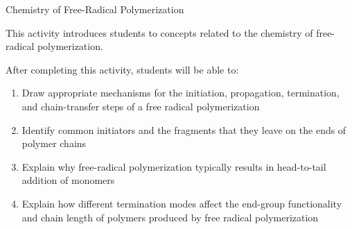 %
%
%
%

\renewcommand{\figpath}{content/polymchem/freeradical/FRPchemistry/figs}
\renewcommand{\labelbase}{FRPchemistry}

\begin{activity}{Chemistry of Free-Radical Polymerization}

\begin{instructornotes}
	This activity introduces students to concepts related to the chemistry of free-radical polymerization.
	
	After completing this activity, students will be able to:
	\begin{enumerate}
		\item Draw appropriate mechanisms for the initiation, propagation, termination, and chain-transfer steps of a free radical polymerization
		\item Identify common initiators and the fragments that they leave on the ends of polymer chains
		\item Explain why free-radical polymerization typically results in head-to-tail addition of monomers
		\item Explain how different termination modes affect the end-group functionality and chain length of polymers produced by free radical polymerization
	\end{enumerate}
	

\end{instructornotes}
\end{activity}
